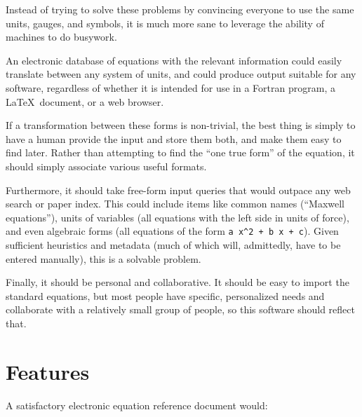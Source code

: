 \documentclass[12pt,letterpaper]{article}
\begin{document}
Instead of trying to solve these problems by convincing everyone to use the same units, gauges, and symbols, it is much more sane to leverage the ability of machines to do busywork.

An electronic database of equations with the relevant information could easily translate between any system of units, and could produce output suitable for any software, regardless of whether it is intended for use in a Fortran program, a \LaTeX\ document, or a web browser.

If a transformation between these forms is non-trivial, the best thing is simply to have a human provide the input and store them both, and make them easy to find later. Rather than attempting to find the ``one true form'' of the equation, it should simply associate various useful formats.

Furthermore, it should take free-form input queries that would outpace any web search or paper index. This could include items like common names (``Maxwell equations''), units of variables (all equations with the left side in units of force), and even algebraic forms (all equations of the form \verb|a x^2 + b x + c|). Given sufficient heuristics and metadata (much of which will, admittedly, have to be entered manually), this is a solvable problem.

Finally, it should be personal and collaborative. It should be easy to import the standard equations, but most people have specific, personalized needs and collaborate with a relatively small group of people, so this software should reflect that.

\section{Features}

\label{features}

A satisfactory electronic equation reference document would:
\end{document}
